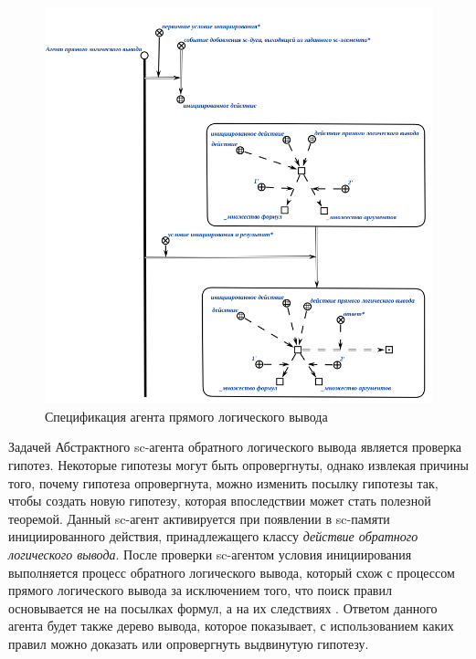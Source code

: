 \begin{figure}[http]
	\includegraphics[scale=0.8]{author/part3/figures/direct_inference_agent.png}
	\caption{Спецификация агента прямого логического вывода}
	\label{fig:direct_inference_agent}
\end{figure}

Задачей Абстрактного sc-агента обратного логического вывода является проверка гипотез. Некоторые гипотезы могут быть опровергнуты, однако извлекая причины того, почему гипотеза опровергнута, можно изменить посылку гипотезы так, чтобы создать новую гипотезу, которая впоследствии может стать полезной теоремой. Данный sc-агент активируется при появлении в sc-памяти инициированного действия, принадлежащего классу \textit{действие обратного логического вывода}. После проверки sc-агентом условия инициирования выполняется процесс обратного логического вывода, который схож с процессом прямого логического вывода за исключением того, что поиск правил основывается не на посылках формул, а на их следствиях \cite{gavrilova}. Ответом данного агента будет также дерево вывода, которое показывает, с использованием каких правил можно доказать или опровергнуть выдвинутую гипотезу.

